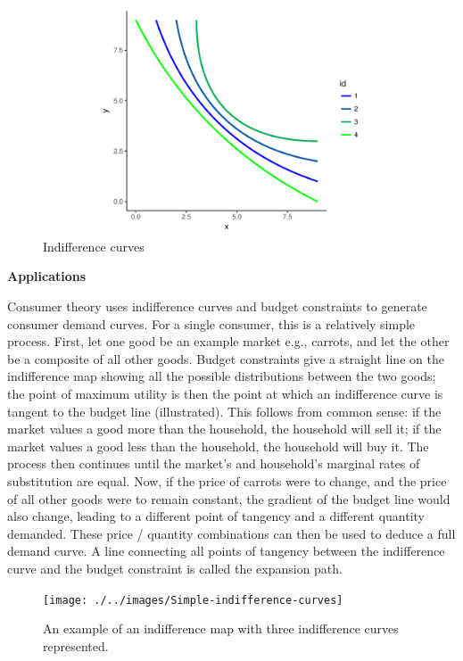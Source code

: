 \documentclass[11pt,]{book}
\theoremstyle{definition}
\theoremstyle{definition}
\theoremstyle{definition}
\theoremstyle{remark}
\begin{document}
\begin{figure}

{\centering \includegraphics[width=0.95\linewidth]{Farm_Management_and_Economics_files/figure-latex/indifference-map-1} 

}

\caption{Indifference curves}\label{fig:indifference-map}
\end{figure}

\textbf{Applications}

Consumer theory uses indifference curves and budget constraints to
generate consumer demand curves. For a single consumer, this is a
relatively simple process. First, let one good be an example market
e.g., carrots, and let the other be a composite of all other goods.
Budget constraints give a straight line on the indifference map showing
all the possible distributions between the two goods; the point of
maximum utility is then the point at which an indifference curve is
tangent to the budget line (illustrated). This follows from common
sense: if the market values a good more than the household, the
household will sell it; if the market values a good less than the
household, the household will buy it. The process then continues until
the market's and household's marginal rates of substitution are equal.
Now, if the price of carrots were to change, and the price of all other
goods were to remain constant, the gradient of the budget line would
also change, leading to a different point of tangency and a different
quantity demanded. These price / quantity combinations can then be used
to deduce a full demand curve. A line connecting all points of tangency
between the indifference curve and the budget constraint is called the
expansion path.

\begin{figure}

{\centering \texttt{[image: ./../images/Simple-indifference-curves]} 

}

\caption{An example of an indifference map with three indifference curves represented.}\label{fig:indifference-curve1}
\end{figure}
\end{document}
